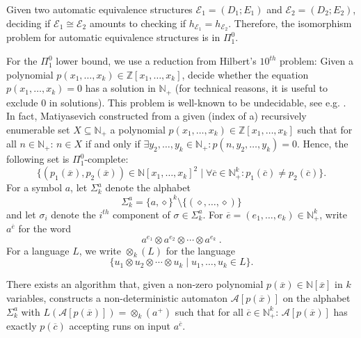 \documentclass[envcountsame]{llncs}
\newcommand{\A}{\mathcal A}
\newcommand{\E}{\mathcal E}
\newcommand{\N}{\mathbb N}
\newcommand{\Z}{\mathbb Z}
\begin{document}
Given two automatic equivalence structures $\E_1=(D_1; E_1)$ and
$\E_2=(D_2;E_2)$, deciding if $\E_1\cong \E_2$ amounts to checking if
$h_{\E_1}=h_{\E_2}$. Therefore, the isomorphism problem for automatic
equivalence structures is in $\Pi^0_1$.

For the $\Pi^0_1$ lower bound, we use a reduction from
Hilbert's $10^{th}$ problem: Given a polynomial
$p(x_1,\ldots,x_k)\in \Z[x_1,\ldots,x_k]$, decide whether the equation
$p(x_1,\ldots,x_k)=0$ has a solution in $\N_+$ (for technical reasons,
it is useful to exclude $0$ in solutions).
This problem is well-known to be
undecidable, see e.g. \cite{Mat93}. In fact, Matiyasevich constructed
from a given (index of a) recursively enumerable set
$X\subseteq \N_+$ a polynomial $p(x_1,\ldots,x_k)\in \Z[x_1,\ldots,x_k]$
such that for all $n \in \N_+$:
$n\in X$ if and only if $\exists y_2,\ldots,y_k \in \N_+ : p(n,y_2,\ldots,y_k)=0$.
Hence, the following set is $\Pi^0_1$-complete:
$$
\{(p_1(\overline x),p_2(\overline x))\in\N[x_1,\dots,x_k]^2 \mid \forall\overline
c\in\N_+^k : p_1(\overline c)\neq p_2(\overline c)\} .
$$
For a symbol $a$, let $\Sigma_k^a$ denote the alphabet
$$
\Sigma_k^a = \{a,\diamond\}^k \setminus \{(\diamond,\ldots,\diamond)\}
$$
and let $\sigma_i$ denote the $i^{th}$ component of $\sigma \in \Sigma_k^a$.
For $\overline e = (e_1,\ldots,e_k) \in\N_+^k$, write
$a^{\overline e}$ for the word
\[
  a^{e_1} \otimes a^{e_2} \otimes \cdots \otimes a^{e_k}\ .
\]
For a language $L$, we write $\otimes_k(L)$ for the language
$$
\{ u_1 \otimes u_2 \otimes \cdots \otimes u_k \mid u_1,\ldots,u_k \in L\}.
$$

\begin{lemma}\label{lm:equiv-runs}
  There exists an algorithm that, given a non-zero polynomial
  $p(\overline{x})\in\N[\overline{x}]$ in $k$ variables, constructs a
  non-deterministic automaton $\A[p(\overline{x})]$ on the alphabet
  $\Sigma_k^a$ with $L(\A[p(\overline x)])=\otimes_k(a^+)$ such that
  for all $\overline c \in \N^k_+$: $\A[p(\overline{x})]$ has exactly
  $p(\overline c)$ accepting runs on input $a^{\overline c}$.
\end{lemma}
\end{document}
